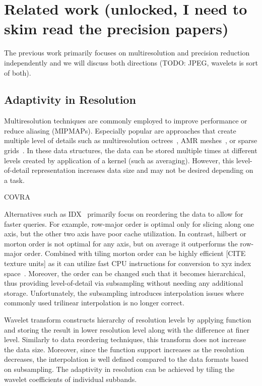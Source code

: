 \section{Related work (unlocked, I need to skim read the precision papers)}

The previous work primarily focuses on multiresolution and precision
reduction independently and we will discuss both directions
(TODO: JPEG, wavelets is sort of both).


\subsection{Adaptivity in Resolution}
Multiresolution techniques are commonly employed to improve performance or
reduce aliasing (MIPMAPs). Especially popular are approaches that create
multiple level of details such as multiresolution octrees~\cite{multires_octree1999},
AMR meshes~\cite{amr1989}, or sparse grids~\cite{vdb2013, spgrid2014}. In these data structures,
the data can be stored multiple times at different levels created by application of a kernel
(such as averaging). However, this level-of-detail representation increases data size
and may not be desired depending on a task.


COVRA~\cite{covra2012}

Alternatives such as IDX~\cite{idx2001} primarily focus on reordering the data to allow
for faster queries. For example, row-major order is optimal only for slicing
along one axis, but the other two axis have poor cache utilization. In contrast, hilbert
or morton order is not optimal for any axis, but on average it outperforms the row-major
order. Combined with tiling morton order can be highly efficient [CITE texture units] as
it can utilize fast CPU instructions for conversion to xyz index space~\cite{spgrid2014}.
Moreover, the order can be changed such that it becomes hierarchical, thus providing
level-of-detail via subsampling without needing any additional storage. Unfortunately,
the subsampling introduces interpolation issues where commonly used trilinear interpolation
is no longer correct.

Wavelet transform constructs hierarchy of resolution levels by applying function and storing
the result in lower resolution level along with the difference at finer level. Similarly to
data reordering techniques, this transform does not increase the data size. Moreover, since
the function support increases as the resolution decreases, the interpolation is well defined
compared to the data formats based on subsampling. The adaptivity in resolution can be achieved
by tiling the wavelet coefficients of individual subbands.

